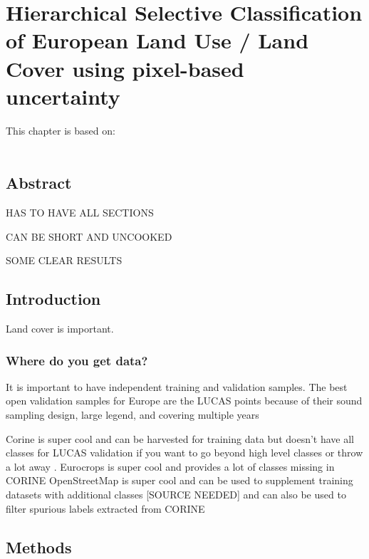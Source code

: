 \chapter[Hierarchical Selective Classification]{Hierarchical Selective Classification of European Land Use / Land Cover using pixel-based uncertainty}
\label{cha:chapter4}
\vspace*{\fill}
This chapter is based on:
\\
\\
\newpage

\section*{Abstract}
HAS TO HAVE ALL SECTIONS

CAN BE SHORT AND UNCOOKED

SOME CLEAR RESULTS
\newpage

\section{Introduction}
Land cover is important. 

\subsection{Where do you get data?}

It is important to have independent training and validation samples. The best open validation samples for Europe are the LUCAS points \citep{dandrimont2021lucas,dandrimont2020harmonised} because of their sound sampling design, large legend, and covering multiple years \citep{venter2022global}

Corine is super cool and can be harvested for training data\citep{witjes2022spatiotemporal,witjes2024iterative}
but doesn't have all classes for LUCAS validation \citep{dandrimont2021lucas} if you want to go beyond high level classes or throw a lot away \citep{pflugmacher2019mapping}.
Eurocrops is super cool and provides a lot of classes missing in CORINE \citep{schneider2023eurocrops}
OpenStreetMap is super cool and can be used to supplement training datasets with additional classes [SOURCE NEEDED] and can also be used to filter spurious labels extracted from CORINE \citep{witjes2022spatiotemporal}



\section{Methods}

